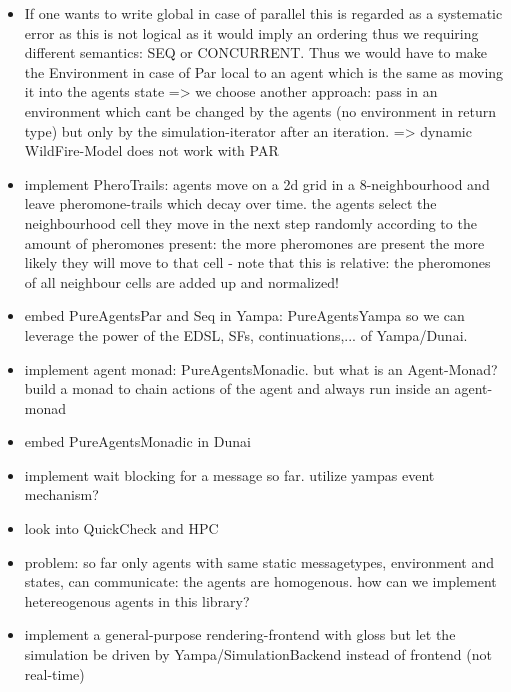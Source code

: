 \begin{itemize}
\item If one wants to write global in case of parallel this is regarded as a systematic error as this is not logical as it would imply an ordering thus we requiring different semantics: SEQ or CONCURRENT. Thus we would have to make the Environment in case of Par local to an agent which is the same as moving it into the agents state => we choose another approach: pass in an environment which cant be changed by the agents (no environment in return type) but only by the simulation-iterator after an iteration.  => dynamic WildFire-Model does not work with PAR

\item implement PheroTrails: agents move on a 2d grid in a 8-neighbourhood and leave pheromone-trails which decay over time. the agents select the neighbourhood cell they move in the next step randomly according to the amount of pheromones present: the more pheromones are present the more likely they will move to that cell - note that this is relative: the pheromones of all neighbour cells are added up and normalized!


\item embed PureAgentsPar and Seq in Yampa: PureAgentsYampa so we can leverage the power of the EDSL, SFs, continuations,... of Yampa/Dunai.
\item implement agent monad: PureAgentsMonadic. but what is an Agent-Monad? build a monad to chain actions of the agent and always run inside an agent-monad
\item embed PureAgentsMonadic in Dunai

\item implement wait blocking for a message so far. utilize yampas event mechanism?

\item look into QuickCheck and HPC
\item problem: so far only agents with same static messagetypes, environment and states, can communicate: the agents are homogenous. how can we implement hetereogenous agents in this library?
\item implement a general-purpose rendering-frontend with gloss but let the simulation be driven by Yampa/SimulationBackend instead of frontend (not real-time)



\end{itemize}
